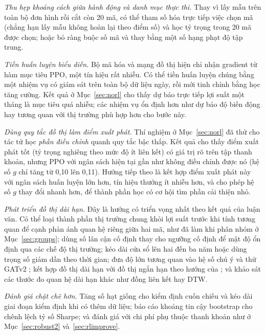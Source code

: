\textit{Thu hẹp khoảng cách giữa hành động và danh mục thực thi.} Thay vì lấy mẫu trên toàn bộ đơn hình rồi cắt còn 20 mã, có thể tham số hóa trực tiếp việc chọn mã (chẳng hạn lấy mẫu không hoàn lại theo điểm số) và học tỷ trọng trong 20 mã được chọn; hoặc bỏ ràng buộc số mã và thay bằng một số hạng phạt độ tập trung.

\textit{Tiền huấn luyện biểu diễn.} Bộ mã hóa và mạng đồ thị hiện chỉ nhận gradient từ hàm mục tiêu PPO, một tín hiệu rất nhiễu. Có thể tiền huấn luyện chúng bằng một nhiệm vụ có giám sát trên toàn bộ dữ liệu ngày, rồi mới tinh chỉnh bằng học tăng cường. Kết quả ở Mục~\ref{sec:norl} cho thấy dự báo trực tiếp lợi suất một tháng là mục tiêu quá nhiễu; các nhiệm vụ ổn định hơn như dự báo độ biến động hay tương quan với thị trường phù hợp hơn cho bước này.

\textit{Dùng quy tắc đồ thị làm điểm xuất phát.} Thí nghiệm ở Mục~\ref{sec:norl} đã thử cho tác tử học \emph{phần điều chỉnh} quanh quy tắc bậc thấp. Kết quả cho thấy điểm xuất phát tốt (tỷ trọng nghiêng theo mức độ ít liên kết) có giá trị rõ trên tập thanh khoản, nhưng PPO với ngân sách hiện tại gần như không điều chỉnh được nó (hệ số $g$ chỉ tăng từ 0,10 lên 0,11). Hướng tiếp theo là kết hợp điểm xuất phát này với ngân sách huấn luyện lớn hơn, tín hiệu thưởng ít nhiễu hơn, và cho phép hệ số $g$ thay đổi nhanh hơn, để thành phần học có cơ hội tìm phần cải thiện nhỏ.

\textit{Phát triển đồ thị dài hạn.} Đây là hướng có triển vọng nhất theo kết quả của luận văn. Có thể loại thành phần thị trường chung khỏi lợi suất trước khi tính tương quan để cạnh phản ánh quan hệ riêng giữa hai mã, như đã làm khi phân nhóm ở Mục~\ref{sec:groups}; dùng số lân cận cố định thay cho ngưỡng cố định để mật độ ổn định qua các chế độ thị trường; kéo dài cửa sổ lên hai đến ba năm hoặc dùng trọng số giảm dần theo thời gian; đưa độ lớn tương quan vào hệ số chú ý và thử GATv2 \cite{brody2022}; kết hợp đồ thị dài hạn với đồ thị ngắn hạn theo hướng của \cite{sun2024cikm}; và khảo sát các thước đo quan hệ dài hạn khác như đồng liên kết hay DTW.

\textit{Đánh giá chặt chẽ hơn.} Tăng số hạt giống cho kiểm định cuốn chiếu và kéo dài giai đoạn kiểm định khi có thêm dữ liệu; báo cáo khoảng tin cậy bootstrap cho chênh lệch tỷ số Sharpe; và đánh giá với chi phí phụ thuộc thanh khoản như ở Mục~\ref{sec:robust2} và~\ref{sec:rlimprove}.

